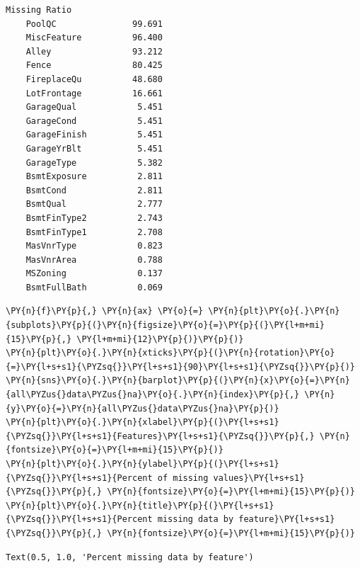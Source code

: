 \documentclass[no-math]{YangThesis}
\begin{document}
\begin{tcolorbox}[breakable, size=fbox, boxrule=.5pt, pad at break*=1mm, opacityfill=0]
	\begin{Verbatim}[commandchars=\\\{\}]
	Missing Ratio
	PoolQC               99.691
	MiscFeature          96.400
	Alley                93.212
	Fence                80.425
	FireplaceQu          48.680
	LotFrontage          16.661
	GarageQual            5.451
	GarageCond            5.451
	GarageFinish          5.451
	GarageYrBlt           5.451
	GarageType            5.382
	BsmtExposure          2.811
	BsmtCond              2.811
	BsmtQual              2.777
	BsmtFinType2          2.743
	BsmtFinType1          2.708
	MasVnrType            0.823
	MasVnrArea            0.788
	MSZoning              0.137
	BsmtFullBath          0.069
	\end{Verbatim}
\end{tcolorbox}

\begin{tcolorbox}[breakable, size=fbox, boxrule=1pt, pad at break*=1mm,colback=cellbackground, colframe=cellborder]
	\begin{Verbatim}[commandchars=\\\{\}]
\PY{n}{f}\PY{p}{,} \PY{n}{ax} \PY{o}{=} \PY{n}{plt}\PY{o}{.}\PY{n}{subplots}\PY{p}{(}\PY{n}{figsize}\PY{o}{=}\PY{p}{(}\PY{l+m+mi}{15}\PY{p}{,} \PY{l+m+mi}{12}\PY{p}{)}\PY{p}{)}
\PY{n}{plt}\PY{o}{.}\PY{n}{xticks}\PY{p}{(}\PY{n}{rotation}\PY{o}{=}\PY{l+s+s1}{\PYZsq{}}\PY{l+s+s1}{90}\PY{l+s+s1}{\PYZsq{}}\PY{p}{)}
\PY{n}{sns}\PY{o}{.}\PY{n}{barplot}\PY{p}{(}\PY{n}{x}\PY{o}{=}\PY{n}{all\PYZus{}data\PYZus{}na}\PY{o}{.}\PY{n}{index}\PY{p}{,} \PY{n}{y}\PY{o}{=}\PY{n}{all\PYZus{}data\PYZus{}na}\PY{p}{)}
\PY{n}{plt}\PY{o}{.}\PY{n}{xlabel}\PY{p}{(}\PY{l+s+s1}{\PYZsq{}}\PY{l+s+s1}{Features}\PY{l+s+s1}{\PYZsq{}}\PY{p}{,} \PY{n}{fontsize}\PY{o}{=}\PY{l+m+mi}{15}\PY{p}{)}
\PY{n}{plt}\PY{o}{.}\PY{n}{ylabel}\PY{p}{(}\PY{l+s+s1}{\PYZsq{}}\PY{l+s+s1}{Percent of missing values}\PY{l+s+s1}{\PYZsq{}}\PY{p}{,} \PY{n}{fontsize}\PY{o}{=}\PY{l+m+mi}{15}\PY{p}{)}
\PY{n}{plt}\PY{o}{.}\PY{n}{title}\PY{p}{(}\PY{l+s+s1}{\PYZsq{}}\PY{l+s+s1}{Percent missing data by feature}\PY{l+s+s1}{\PYZsq{}}\PY{p}{,} \PY{n}{fontsize}\PY{o}{=}\PY{l+m+mi}{15}\PY{p}{)}
	\end{Verbatim}
\end{tcolorbox}

\begin{tcolorbox}[breakable, size=fbox, boxrule=.5pt, pad at break*=1mm, opacityfill=0]
	\begin{Verbatim}[commandchars=\\\{\}]
	Text(0.5, 1.0, 'Percent missing data by feature')
	\end{Verbatim}
\end{tcolorbox}
\end{document}

